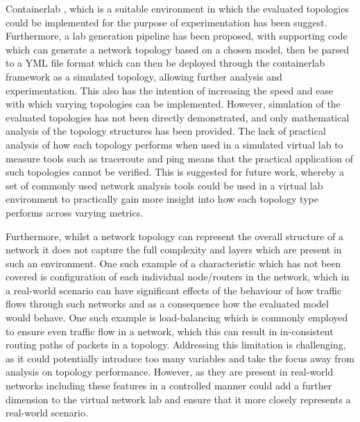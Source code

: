 Containerlab \cite{containerlab}, which is a suitable environment in which the evaluated topologies could be implemented for the purpose of experimentation has been suggest. Furthermore, a lab generation pipeline has been proposed, with supporting code which can generate a network topology based on a chosen model, then be parsed to a YML file format which can then be deployed through the containerlab \cite{containerlab} framework as a simulated topology, allowing further analysis and experimentation. This also has the intention of increasing the speed and ease with which varying topologies can be implemented.  However, simulation of the evaluated topologies has not been directly demonstrated, and only mathematical analysis of the topology structures has been provided. The lack of practical analysis of how each topology performs when used in a simulated virtual lab to measure tools such as traceroute and ping means that the practical application of such topologies cannot be verified. This is suggested for future work, whereby a set of commonly used network analysis tools could be used in a virtual lab environment to practically gain more insight into how each topology type performs across varying metrics. 

Furthermore, whilst a network topology can represent the overall structure of a network it does not capture the full complexity and layers which are present in such an environment. One such example of a characteristic which has not been covered is configuration of each individual node/routers in the network, which in a real-world scenario can have significant effects of the behaviour of how traffic flows through such networks and as a consequence how the evaluated model would behave. One such example is load-balancing which is commonly employed to ensure even traffic flow in a network, which this can result in in-consistent routing paths of packets in a topology. Addressing this limitation is challenging, as it could potentially introduce too many variables and take the focus away from analysis on topology performance. However, as they are present in real-world networks including these features in a controlled manner could add a further dimension to the virtual network lab and ensure that it more closely represents a real-world scenario. 

